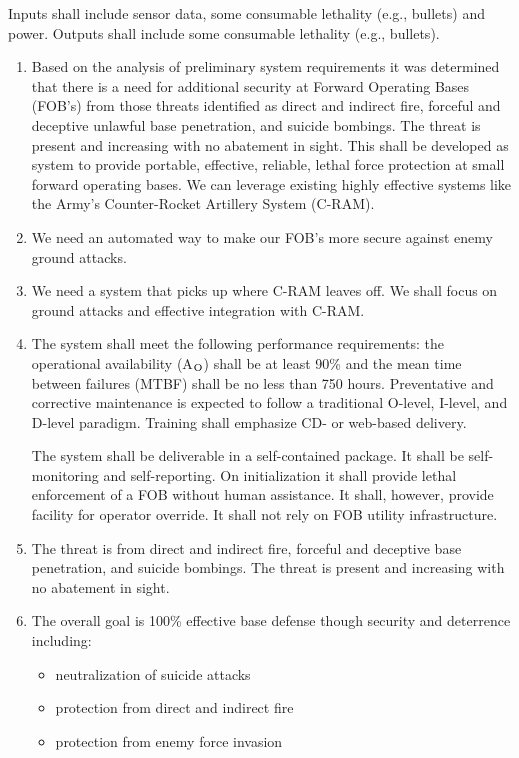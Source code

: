 \documentclass[letterpaper,10pt]{article}
\begin{document}
\par
Inputs shall include sensor data, some consumable lethality (e.g., bullets) and power.  Outputs shall include some consumable lethality (e.g., bullets).
\pagebreak
\begin{enumerate}
\item
Based on the analysis of preliminary system requirements it was determined that there is a need for additional security at Forward Operating Bases (FOB's) from those threats identified as direct and indirect fire, forceful and deceptive unlawful base penetration, and suicide bombings.  The threat is present and increasing with no abatement in sight.  This shall be developed as system to provide portable, effective, reliable, lethal force protection at small forward operating bases.  We can leverage existing highly effective systems like the Army's Counter-Rocket Artillery System (C-RAM).
\item
We need an automated way to make our FOB's more secure against enemy ground attacks.
\item
We need a system that picks up where C-RAM leaves off.  We shall focus on ground attacks and effective integration with C-RAM.
\item
The system shall meet the following performance requirements: the operational availability (A$_{\rm O}$) shall be at least 90\% and the mean time between failures (MTBF) shall be no less than 750 hours.  Preventative and corrective maintenance is expected to follow a traditional O-level, I-level, and D-level paradigm.  Training shall emphasize CD- or web-based delivery.
\par The system shall be deliverable in a self-contained package.  It shall be self-monitoring and self-reporting.  On initialization it shall provide lethal enforcement of a FOB without human assistance.  It shall, however, provide facility for operator override.  It shall not rely on FOB utility infrastructure.
\item
The threat is from direct and indirect fire, forceful and deceptive base penetration, and suicide bombings.  The threat is present and increasing with no abatement in sight.
\item
The overall goal is 100\% effective base defense though security and deterrence including:
\begin{itemize}
\item neutralization of suicide attacks
\item protection from direct and indirect fire
\item protection from enemy force invasion

\end{itemize}
\end{enumerate}
\end{document}
